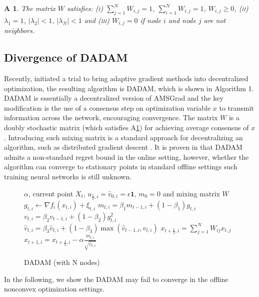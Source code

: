 \documentclass{article} %
\newtheorem{assumptionA}{A\!\!}
\begin{document}
\begin{assumptionA}\label{a:matrixW}
The matrix $W$ satisfies: \textsc{(i)} $\sum_{j=1}^N W_{i,j} = 1$,  $\sum_{i=1}^N W_{i,j} = 1$, $W_{i,j} \geq 0$, \textsc{(ii)} $\lambda_1 = 1$, $|\lambda_2| < 1$, $|\lambda_N| < 1 $ and \textsc{(iii)} $W_{i,j} = 0 $ if node $i$ and node $j$ are not neighbors.
\end{assumptionA}

\vspace{-0.05in}
\subsection{Divergence of DADAM}
\vspace{-0.05in}

Recently, \citet{nazari2019dadam} initiated a trial to bring adaptive gradient methods into decentralized optimization, the resulting algorithm is DADAM, which is shown in Algorithm 1.
DADAM is essentially a decentralized version of AMSGrad and the key modification is the use of a consensus step on optimization variable $x$ to transmit information across the network, encouraging convergence. The matrix $W$ is a doubly stochastic matrix (which satisfies A\ref{a:matrixW}) for achieving  average consensus of $x$. Introducing such mixing matrix is a standard approach for decentralizing an algorithm, such as distributed gradient descent \citep{nedic2009distributed, yuan2016convergence}. It is proven in \citet{nazari2019dadam} that DADAM admits a non-standard regret bound in the online setting, however, whether the algorithm can converge to stationary points in standard offline settings such training neural networks is still unknown.
\begin{figure}\vspace{-0.15in}
\begin{minipage}{\linewidth}
\begin{algorithm}[H]
	\caption{DADAM (with N nodes)}
	\label{alg: dadam}
	\begin{algorithmic}[1]
		 $\alpha$, current point $X_t$, $u_{\frac{1}{2},i} = \hat v_{0,i} = \epsilon \mathbf{1}$, $m_0=0$ and mixing matrix $W$
		\STATE  $g_{t,i}  \leftarrow \nabla f_i(x_{t,i}) + \xi_{t,i}$
		\STATE $m_{t,i} = \beta_1 m_{t-1,i} + (1-\beta_1) g_{t,i}$ 
		\STATE $v_{t,i} = \beta_2 v_{t-1,i}+(1-\beta_2)g_{t,i}^2$
		\STATE $\hat v_{t,i} = \beta_3 \hat v_{t,i} + (1-\beta_3) \max(\hat v_{t-1,i},v_{t,i})$
		\STATE $x_{t+\frac{1}{2},i} = \sum_{j=1}^N W_{ij}x_{t,j}$
		\STATE $x_{t+1,i} = x_{t+\frac{1}{2},i} - \alpha \frac{m_{t,i}}{\sqrt{\hat v_{t,i}}}$
		\ENDFAP
		\ENDFOR
	\end{algorithmic}
\end{algorithm}\vspace{-0.1in}
\end{minipage}\end{figure}
In the following, we show the DADAM may fail to converge in the offline nonconvex optimization settings.
\end{document}
